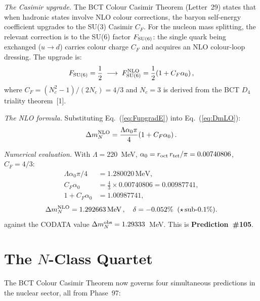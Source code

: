 \documentclass[10pt,twocolumn]{article}
\begin{document}
\textit{The Casimir upgrade.} The BCT Colour Casimir Theorem (Letter~29) states that when
hadronic states involve NLO colour corrections, the baryon self-energy coefficient upgrades to
the SU(3) Casimir $C_F$. For the nucleon mass splitting, the relevant correction is to the
SU(6) factor $F_{\rm SU(6)}$: the single quark being exchanged ($u \to d$) carries colour
charge $C_F$ and acquires an NLO colour-loop dressing. The upgrade is:
\begin{equation}
F_{\rm SU(6)} = \frac{1}{2}
  \;\longrightarrow\;
  F_{\rm SU(6)}^{\rm NLO} = \frac{1}{2}(1+C_F\alpha_0)\,,
\label{eq:FupgradE}
\end{equation}
where $C_F = (N_c^2-1)/(2N_c) = 4/3$ and $N_c = 3$ is derived from the BCT $D_4$ triality
theorem~[1].

\textit{The NLO formula.} Substituting Eq.~(\ref{eq:FupgradE}) into Eq.~(\ref{eq:DmLO}):
\begin{equation}
\Delta m_N^{\rm NLO} = \frac{\Lambda\alpha_0\pi}{4}(1+C_F\alpha_0)\,.
\label{eq:DmNLO}
\end{equation}

\textit{Numerical evaluation.} With $\Lambda = 220$~MeV, $\alpha_0 = r_{\rm oct}\,r_{\rm tet}/\pi
= 0.00740806$, $C_F = 4/3$:
\begin{align}
\Lambda\alpha_0\pi/4 &= 1.280020\,\text{MeV}, \label{eq:n1}\\
C_F\alpha_0 &= \tfrac{4}{3}\times 0.00740806 = 0.00987741, \label{eq:n2}\\
1 + C_F\alpha_0 &= 1.00987741, \label{eq:n3}
\end{align}
\begin{equation}
\Delta m_N^{\rm NLO} = 1.292663\,\text{MeV}\,,\quad
\delta = -0.052\%\;\;(\star\,\text{sub-0.1\%}).
\label{eq:result}
\end{equation}
against the CODATA value $\Delta m_N^{\rm obs} = 1.29333$~MeV. This is \textbf{Prediction~\#105}.

\section{The $N$-Class Quartet}

The BCT Colour Casimir Theorem now governs four simultaneous predictions in the nuclear sector,
all from Phase~97:
\end{document}
